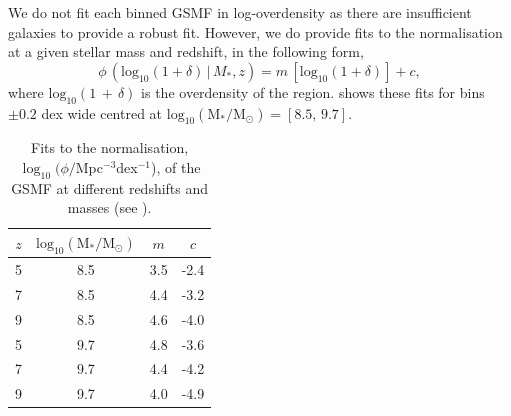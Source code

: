 We do not fit each binned GSMF in log-overdensity as there are insufficient galaxies to provide a robust fit.
However, we do provide fits to the normalisation at a given stellar mass and redshift, in the following form,
\begin{equation}
  \phi \,(\mathrm{log_{10}}(1+\delta) \,|\, M_{*}, z) = m \,[\mathrm{log_{10}}(1+\delta)] + c,
\end{equation}
where $\mathrm{log_{10}}(1\,+\,\delta)$ is the overdensity of the region.
 shows these fits for bins $\pm 0.2$ dex wide centred at $\mathrm{log_{10}(M_{*}/M_{\odot})} = [8.5,\,9.7]$.

\begin{table}
	\centering
	\caption{Fits to the normalisation, $\log_{10}(\phi/$Mpc$^{-3}$dex$^{-1}$), of the GSMF at different redshifts and masses (see ).}
	\label{tab:norm_GSMF}
	\begin{tabular}{cccc} %
		\hline
		$z$ & $\mathrm{log_{10}(M_{*}/M_{\odot})}$ & $m$ & $c$ \\
		\hline
        5 & 8.5 & 3.5 & -2.4 \\
        7 & 8.5 & 4.4 & -3.2 \\
        9 & 8.5 & 4.6 & -4.0 \\
        5 & 9.7 & 4.8 & -3.6 \\
        7 & 9.7 & 4.4 & -4.2 \\
        9 & 9.7 & 4.0 & -4.9 \\
    \hline
	\end{tabular}
\end{table}




